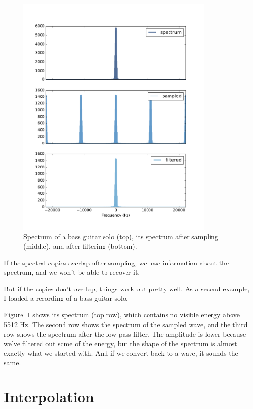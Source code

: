 \documentclass[12pt]{book}
\begin{document}
\begin{figure}
\centerline{\includegraphics[height=4.8in]{figs/sampling5.pdf}}
\caption{Spectrum of a bass guitar solo (top), its spectrum after
sampling (middle), and after filtering (bottom).}
\label{fig.sampling5}
\end{figure}

If the spectral copies overlap after sampling, we lose information
about the spectrum, and we won't be able to recover it.

But if the copies don't overlap, things work out pretty well.  As
a second example, I loaded a recording of a bass guitar solo.

Figure~\ref{fig.sampling5} shows its spectrum (top row), which contains
no visible energy above 5512 Hz.  The second row shows the spectrum of
the sampled wave, and the third row shows the spectrum after the low
pass filter.  The amplitude is lower because we've filtered out some
of the energy, but the shape of the spectrum is almost exactly what we
started with.  And if we convert back to a wave, it sounds the same.


\section{Interpolation}
\end{document}
